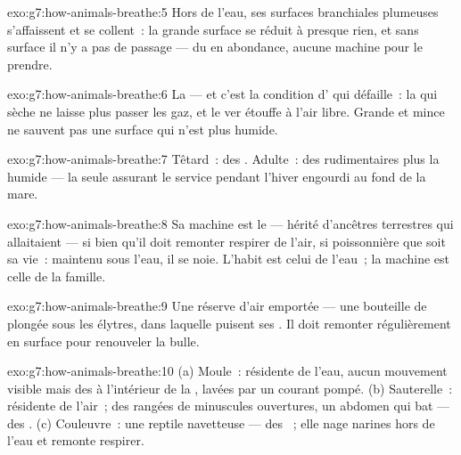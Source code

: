 \begin{solution}{exo:g7:how-animals-breathe:5}
Hors de l'eau, ses surfaces branchiales plumeuses s'affaissent et se
collent~: la grande surface se réduit à presque rien, et sans
surface il n'y a pas de passage --- du  en abondance,
aucune machine pour le prendre.
\end{solution}

\begin{solution}{exo:g7:how-animals-breathe:6}
La  --- et c'est la condition d' qui
défaille~: la  qui sèche ne laisse plus passer les gaz, et le
ver étouffe à l'air libre. Grande et mince ne sauvent pas une
surface qui n'est plus humide.
\end{solution}

\begin{solution}{exo:g7:how-animals-breathe:7}
Têtard~: des . Adulte~: des  rudimentaires plus la
 humide --- la  seule assurant le service pendant l'hiver
engourdi au fond de la mare.
\end{solution}

\begin{solution}{exo:g7:how-animals-breathe:8}
Sa machine est le  --- hérité d'ancêtres terrestres qui
allaitaient --- si bien qu'il doit remonter respirer de l'air, si
poissonnière que soit sa vie~: maintenu sous l'eau, il se noie.
L'habit est celui de l'eau~; la machine est celle de la famille.
\end{solution}

\begin{solution}{exo:g7:how-animals-breathe:9}
Une réserve d'air emportée --- une bouteille de plongée sous les
élytres, dans laquelle puisent ses . Il doit remonter
régulièrement en surface pour renouveler la bulle.
\end{solution}

\begin{solution}{exo:g7:how-animals-breathe:10}
(a) Moule~: résidente de l'eau, aucun mouvement visible mais des
 à l'intérieur de la , lavées par un courant pompé.
(b) Sauterelle~: résidente de l'air~; des rangées de minuscules
ouvertures, un abdomen qui bat --- des . (c) Couleuvre~: une
reptile navetteuse --- des ~; elle nage narines hors de
l'eau et remonte respirer.
\end{solution}

